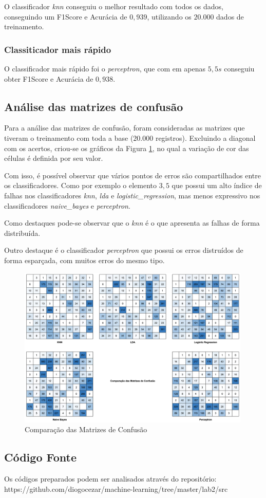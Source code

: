 \documentclass[12pt]{article}
\begin{document}
O classificador \textit{knn} conseguiu o melhor resultado com todos os dados, conseguindo um F1Score e Acurácia de $0,939$, utilizando os $20.000$ dados de treinamento.

\subsubsection{Classiticador mais rápido}

O classificador mais rápido foi o \textit{perceptron}, que com em apenas $5,5s$ conseguiu obter F1Score e Acurácia de $0,938$.

\subsection{Análise das matrizes de confusão}

Para a análise das matrizes de confusão, foram consideradas as matrizes que tiveram o treinamento com toda a base ($20.000$ registros). Excluindo a diagonal com os acertos, criou-se os gráficos da Figura \ref{fig:comparacao_conf_mat}, no qual a variação de cor das células é definida por seu valor.

Com isso, é possível observar que vários pontos de erros são compartilhados entre os classificadores. Como por exemplo o elemento $3,5$ que possui um alto índice de falhas nos classificadores \textit{knn}, \textit{lda} e \textit{logistic\_regression}, mas menos expressivo nos classificadores \textit{naive\_bayes} e \textit{perceptron}.

Como destaques pode-se observar que o \textit{knn} é o que apresenta as falhas de forma distribuída.

Outro destaque é o classificador \textit{perceptron} que possui os erros distruídos de forma esparçada, com muitos erros do mesmo tipo.

\begin{figure}[!htb]
  \centering
  \includegraphics[width=30em]{images/image_comparacao_conf_mat.png}
  \caption{Comparação das Matrizes de Confusão}
  \label{fig:comparacao_conf_mat}
\end{figure}

\subsection{Código Fonte}

Os códigos preparados podem ser analisados através do repositório: https://github.com/diogocezar/machine-learning/tree/master/lab2/src
\end{document}
